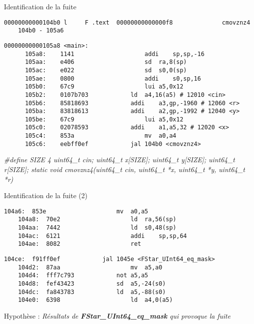 \documentclass[A4,svgnames,9pt,aspectratio=169]{beamer}
\begin{document}
\begin{frame}[fragile]{Identification de la fuite}
  
  \begin{lstlisting}[style=global, caption={Fonction ciblé}, gobble=4]
    00000000000104b0 l     F .text	00000000000000f8              cmovznz4
    104b0 - 105a6
  \end{lstlisting}

  \begin{lstlisting}[style=global, caption={Appels précédents}, gobble=4]
    00000000000105a8 <main>:
      105a8:	1141                	addi	sp,sp,-16
      105aa:	e406                	sd	ra,8(sp)
      105ac:	e022                	sd	s0,0(sp)
      105ae:	0800                	addi	s0,sp,16
      105b0:	67c9                	lui	a5,0x12
      105b2:	0107b703          	ld	a4,16(a5) # 12010 <cin>
      105b6:	85818693          	addi	a3,gp,-1960 # 12060 <r>
      105ba:	83818613          	addi	a2,gp,-1992 # 12040 <y>
      105be:	67c9                	lui	a5,0x12
      105c0:	02078593          	addi	a1,a5,32 # 12020 <x>
      105c4:	853a                	mv	a0,a4
      105c6:	eebff0ef          	jal	104b0 <cmovznz4>
  \end{lstlisting}

\textit{\tiny{
\#define SIZE 4
uint64\_t cin;
uint64\_t x[SIZE];
uint64\_t y[SIZE];
uint64\_t r[SIZE];
static void cmovznz4(uint64\_t cin, uint64\_t *x, uint64\_t *y, uint64\_t *r)}}
  
\end{frame}


\begin{frame}[fragile]{Identification de la fuite (2)}
  
  \begin{lstlisting}[style=global, caption={Extrait de la fonction de masquage}, gobble=4]
    104a6:	853e                	mv	a0,a5
    104a8:	70e2                	ld	ra,56(sp)
    104aa:	7442                	ld	s0,48(sp)
    104ac:	6121                	addi	sp,sp,64
    104ae:	8082                	ret
  \end{lstlisting}

  \begin{lstlisting}[style=global, caption={Extrait avant la première fuite}, gobble=4]
    104ce:	f91ff0ef          	jal	1045e <FStar_UInt64_eq_mask>
    104d2:	87aa                	mv	a5,a0
    104d4:	fff7c793          	not	a5,a5
    104d8:	fef43423          	sd	a5,-24(s0)
    104dc:	fa843783          	ld	a5,-88(s0)
    104e0:	6398                	ld	a4,0(a5)
  \end{lstlisting}
  
  Hypothèse : \textit{Résultats de \textbf{FStar\_UInt64\_eq\_mask} qui provoque la fuite}

\end{frame}
\end{document}
